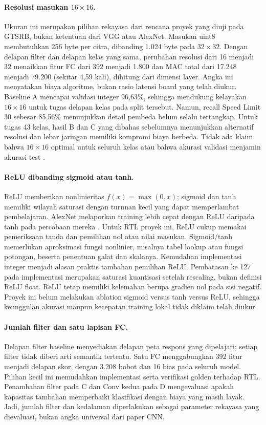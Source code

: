 \documentclass[11pt,a4paper]{article}
\begin{document}
\paragraph{Resolusi masukan $16\times16$.}
Ukuran ini merupakan pilihan rekayasa dari rencana proyek yang diuji pada
GTSRB, bukan ketentuan dari VGG atau AlexNet. Masukan uint8 membutuhkan
256 byte per citra, dibanding 1.024 byte pada $32\times32$. Dengan delapan
filter dan delapan kelas yang sama, perubahan resolusi dari 16 menjadi 32
menaikkan fitur FC dari 392 menjadi 1.800 dan MAC total dari 17.248 menjadi
79.200 (sekitar 4,59 kali), dihitung dari dimensi layer. Angka ini menyatakan
biaya algoritme, bukan rasio latensi board yang telah diukur.
Baseline A mencapai validasi integer 96,63\%, sehingga mendukung kelayakan
$16\times16$ untuk tugas delapan kelas pada split tersebut. Namun, recall
Speed Limit 30 sebesar 85,56\% menunjukkan detail pembeda belum selalu
tertangkap. Untuk tugas 43 kelas, hasil B dan C yang dibahas sebelumnya
menunjukkan alternatif resolusi dan lebar jaringan memiliki kompromi biaya
berbeda. Tidak ada klaim bahwa $16\times16$ optimal untuk seluruh kelas
atau bahwa akurasi validasi menjamin akurasi test \cite{repo}.

\paragraph{ReLU dibanding sigmoid atau tanh.}
ReLU memberikan nonlinieritas $f(x)=\max(0,x)$; sigmoid dan tanh memiliki
wilayah saturasi dengan turunan kecil yang dapat memperlambat pembelajaran.
AlexNet melaporkan training lebih cepat dengan ReLU daripada tanh pada
percobaan mereka \cite{alexnet}. Untuk RTL proyek ini, ReLU cukup memakai
pemeriksaan tanda dan pemilihan nol atau nilai masukan. Sigmoid/tanh memerlukan
aproksimasi fungsi nonlinier, misalnya tabel lookup atau fungsi potongan,
beserta penentuan galat dan skalanya. Kemudahan implementasi integer menjadi
alasan praktis tambahan pemilihan ReLU. Pembatasan ke 127 pada implementasi
merupakan saturasi kuantisasi setelah rescaling, bukan definisi ReLU float.
ReLU tetap memiliki kelemahan berupa gradien nol pada sisi negatif. Proyek
ini belum melakukan ablation sigmoid versus tanh versus ReLU, sehingga
keunggulan akurasi maupun kecepatan training lokal tidak diklaim telah diukur.

\paragraph{Jumlah filter dan satu lapisan FC.}
Delapan filter baseline menyediakan delapan peta respons yang dipelajari;
setiap filter tidak diberi arti semantik tertentu. Satu FC menggabungkan
392 fitur menjadi delapan skor, dengan 3.208 bobot dan 16 bias pada seluruh
model. Pilihan kecil ini memudahkan implementasi serta verifikasi golden
terhadap RTL. Penambahan filter pada C dan Conv kedua pada D mengevaluasi
apakah kapasitas tambahan memperbaiki klasifikasi dengan biaya yang masih
layak. Jadi, jumlah filter dan kedalaman diperlakukan sebagai parameter
rekayasa yang dievaluasi, bukan angka universal dari paper CNN.
\end{document}
